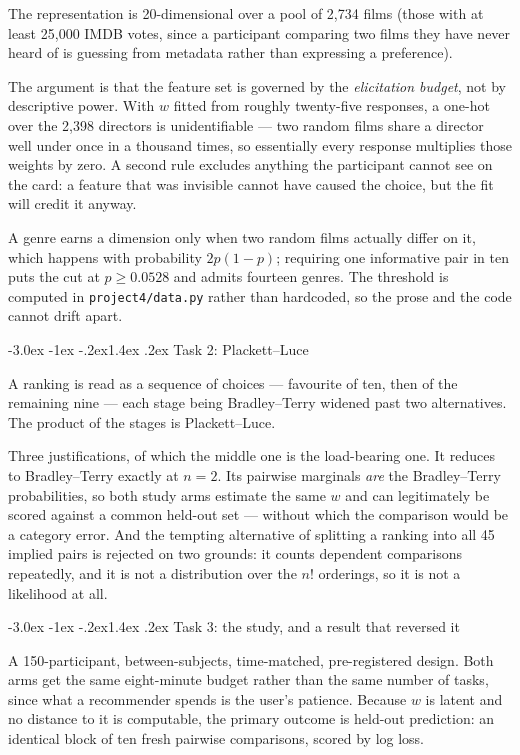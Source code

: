 \documentclass[11pt,a4paper]{article}
\makeatletter
\renewcommand\subsection{\@startsection{subsection}{2}{\z@}%
  {-3.0ex \@plus -1ex \@minus -.2ex}{1.4ex \@plus .2ex}%
  {\normalfont\large\sffamily\bfseries\color{accent}}}
\newcommand{\file}[1]{\texttt{\small #1}}
\makeatother
\begin{document}
The representation is 20-dimensional over a pool of 2{,}734 films (those with at
least 25{,}000 IMDB votes, since a participant comparing two films they have never
heard of is guessing from metadata rather than expressing a preference).

The argument is that the feature set is governed by the \emph{elicitation budget},
not by descriptive power. With $w$ fitted from roughly twenty-five responses, a
one-hot over the 2{,}398 directors is unidentifiable --- two random films share a
director well under once in a thousand times, so essentially every response
multiplies those weights by zero. A second rule excludes anything the participant
cannot see on the card: a feature that was invisible cannot have caused the
choice, but the fit will credit it anyway.

A genre earns a dimension only when two random films actually differ on it, which
happens with probability $2p(1-p)$; requiring one informative pair in ten puts the
cut at $p \geq 0.0528$ and admits fourteen genres. The threshold is computed in
\file{project4/data.py} rather than hardcoded, so the prose and the code cannot
drift apart.

\subsection{Task 2: Plackett--Luce}

A ranking is read as a sequence of choices --- favourite of ten, then of the
remaining nine --- each stage being Bradley--Terry widened past two alternatives.
The product of the stages is Plackett--Luce.

Three justifications, of which the middle one is the load-bearing one. It reduces
to Bradley--Terry exactly at $n = 2$. Its pairwise marginals \emph{are} the
Bradley--Terry probabilities, so both study arms estimate the same $w$ and can
legitimately be scored against a common held-out set --- without which the
comparison would be a category error. And the tempting alternative of splitting a
ranking into all 45 implied pairs is rejected on two grounds: it counts dependent
comparisons repeatedly, and it is not a distribution over the $n!$ orderings, so
it is not a likelihood at all.

\subsection{Task 3: the study, and a result that reversed it}

A 150-participant, between-subjects, time-matched, pre-registered design. Both
arms get the same eight-minute budget rather than the same number of tasks, since
what a recommender spends is the user's patience. Because $w$ is latent and no
distance to it is computable, the primary outcome is held-out prediction: an
identical block of ten fresh pairwise comparisons, scored by log loss.
\end{document}

